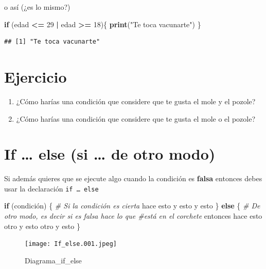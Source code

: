 \documentclass[
]{book}
\newenvironment{Shaded}{\begin{snugshade}}{\end{snugshade}}
\newcommand{\CommentTok}[1]{\textcolor[rgb]{0.56,0.35,0.01}{\textit{#1}}}
\newcommand{\ControlFlowTok}[1]{\textcolor[rgb]{0.13,0.29,0.53}{\textbf{#1}}}
\newcommand{\DecValTok}[1]{\textcolor[rgb]{0.00,0.00,0.81}{#1}}
\newcommand{\FunctionTok}[1]{\textcolor[rgb]{0.13,0.29,0.53}{\textbf{#1}}}
\newcommand{\NormalTok}[1]{#1}
\newcommand{\SpecialCharTok}[1]{\textcolor[rgb]{0.81,0.36,0.00}{\textbf{#1}}}
\newcommand{\StringTok}[1]{\textcolor[rgb]{0.31,0.60,0.02}{#1}}
\begin{document}
o así (¿es lo mismo?)

\begin{Shaded}
\begin{Highlighting}[]
\ControlFlowTok{if}\NormalTok{ (edad }\SpecialCharTok{\textless{}=} \DecValTok{29} \SpecialCharTok{|}\NormalTok{ edad }\SpecialCharTok{\textgreater{}=} \DecValTok{18}\NormalTok{)\{}
  \FunctionTok{print}\NormalTok{(}\StringTok{"Te toca vacunarte"}\NormalTok{)}
\NormalTok{\}}
\end{Highlighting}
\end{Shaded}

\begin{verbatim}
## [1] "Te toca vacunarte"
\end{verbatim}

\section{Ejercicio}\label{ejercicio}

\begin{enumerate}
\def\labelenumi{\arabic{enumi}.}
\item
  ¿Cómo harías una condición que considere que te gusta el mole y el pozole?
\item
  ¿Cómo harías una condición que considere que te gusta el mole o el pozole?
\end{enumerate}

\section{If \ldots{} else (si \ldots{} de otro modo)}\label{if-else-si-de-otro-modo}

Si además quieres que se ejecute algo cuando la condición es \textbf{falsa} entonces debes usar la declaración \texttt{if\ …\ else}

\begin{Shaded}
\begin{Highlighting}[]
\ControlFlowTok{if}\NormalTok{ (condición) \{ }\CommentTok{\# Si la condición es cierta}
\NormalTok{hace esto}
\NormalTok{y esto}
\NormalTok{y esto}
\NormalTok{\} }\ControlFlowTok{else}\NormalTok{ \{ }\CommentTok{\# De otro modo, es decir si es falsa hace lo que \#está en el corchete}
\NormalTok{entonces hace esto otro}
\NormalTok{y esto otro}
\NormalTok{y esto}
\NormalTok{\}}
\end{Highlighting}
\end{Shaded}

\begin{figure}
\centering
\texttt{[image: If\_else.001.jpeg]}
\caption{Diagrama\_if\_else}\label{id}
\end{figure}
\end{document}
